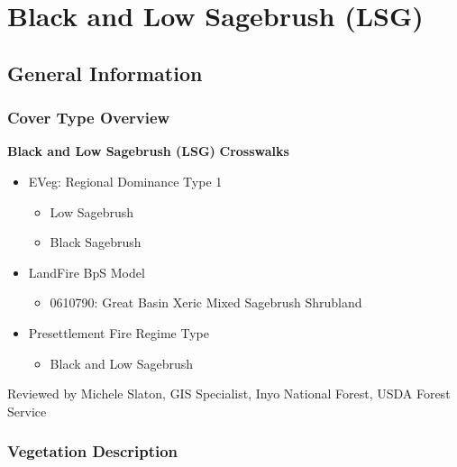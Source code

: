 \newpage
\section{Black and Low Sagebrush (LSG)}
\label{lsg-description}

\subsection*{General Information}

\subsubsection{Cover Type Overview}

\textbf{Black and Low Sagebrush (LSG)}
\newline
\textbf{Crosswalks}
\begin{itemize}
	\item EVeg: Regional Dominance Type 1
	\begin{itemize}
		\item Low Sagebrush
		\item Black Sagebrush
	\end{itemize}

	\item LandFire BpS Model
	\begin{itemize}
		\item 0610790: Great Basin Xeric Mixed Sagebrush Shrubland
	\end{itemize}

	\item Presettlement Fire Regime Type
	\begin{itemize}
		\item Black and Low Sagebrush
	\end{itemize}
\end{itemize}

\noindent Reviewed by Michele Slaton, GIS Specialist, Inyo National Forest, USDA Forest Service

\subsubsection{Vegetation Description}
